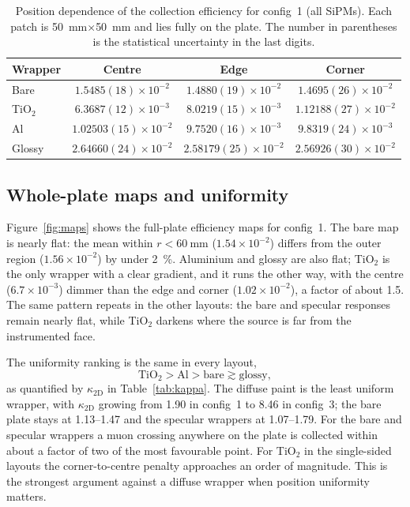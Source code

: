 \documentclass[preprint,12pt]{elsarticle}
\newcommand{\ktwo}{\ensuremath{\kappa_{\mathrm{2D}}}}
\begin{document}
\begin{table}[t]
\centering
\caption{Position dependence of the collection efficiency for config~1 (all
SiPMs). Each patch is \SI{50}{\milli\meter}$\times$\SI{50}{\milli\meter} and
lies fully on the plate. The number in parentheses is the statistical
uncertainty in the last digits.}
\label{tab:positions}
\small
\begin{tabular}{@{}lccc@{}}
\toprule
Wrapper & Centre & Edge & Corner \\
\midrule
Bare   & $1.5485(18)\times10^{-2}$ & $1.4880(19)\times10^{-2}$ & $1.4695(26)\times10^{-2}$ \\
TiO$_2$& $6.3687(12)\times10^{-3}$ & $8.0219(15)\times10^{-3}$ & $1.12188(27)\times10^{-2}$ \\
Al     & $1.02503(15)\times10^{-2}$ & $9.7520(16)\times10^{-3}$ & $9.8319(24)\times10^{-3}$ \\
Glossy & $2.64660(24)\times10^{-2}$ & $2.58179(25)\times10^{-2}$ & $2.56926(30)\times10^{-2}$ \\
\bottomrule
\end{tabular}
\end{table}

\subsection{Whole-plate maps and uniformity}

Figure~\ref{fig:maps} shows the full-plate efficiency maps for config~1. The
bare map is nearly flat: the mean within $r<\SI{60}{\milli\meter}$
($1.54\times10^{-2}$) differs from the outer region ($1.56\times10^{-2}$) by
under \SI{2}{\percent}. Aluminium and glossy are also flat; TiO$_2$ is the only
wrapper with a clear gradient, and it runs the other way, with the centre
($6.7\times10^{-3}$) dimmer than the edge and corner
($1.02\times10^{-2}$), a factor of about \num{1.5}. The same pattern repeats in
the other layouts: the bare and specular responses remain nearly flat, while
TiO$_2$ darkens where the source is far from the instrumented face.

The uniformity ranking is the same in every layout,
\[
\text{TiO}_2 > \text{Al} > \text{bare} \gtrsim \text{glossy},
\]
as quantified by $\ktwo$ in Table~\ref{tab:kappa}. The diffuse paint is the
least uniform wrapper, with $\ktwo$ growing from \num{1.90} in config~1 to
\num{8.46} in config~3; the bare plate stays at \num{1.13}--\num{1.47} and the
specular wrappers at \num{1.07}--\num{1.79}. For the bare and specular wrappers
a muon crossing anywhere on the plate is collected within about a factor of two
of the most favourable point. For TiO$_2$ in the single-sided layouts the
corner-to-centre penalty approaches an order of magnitude. This is the strongest
argument against a diffuse wrapper when position uniformity matters.
\end{document}
